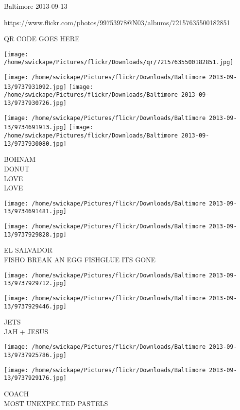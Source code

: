 \documentclass[10pt,letterpaper]{article}
\begin{document}
Baltimore 2013-09-13

https://www.flickr.com/photos/99753978@N03/albums/72157635500182851

QR CODE GOES HERE

\texttt{[image: /home/swickape/Pictures/flickr/Downloads/qr/72157635500182851.jpg]}
\pagebreak

\texttt{[image: /home/swickape/Pictures/flickr/Downloads/Baltimore 2013-09-13/9737931092.jpg]}
\texttt{[image: /home/swickape/Pictures/flickr/Downloads/Baltimore 2013-09-13/9737930726.jpg]}

\texttt{[image: /home/swickape/Pictures/flickr/Downloads/Baltimore 2013-09-13/9734691913.jpg]}
\texttt{[image: /home/swickape/Pictures/flickr/Downloads/Baltimore 2013-09-13/9737930080.jpg]}

BOHNAM\\
DONUT\\
LOVE\\
LOVE\\
\pagebreak

\texttt{[image: /home/swickape/Pictures/flickr/Downloads/Baltimore 2013-09-13/9734691481.jpg]}

\vspace{0.25in}
\texttt{[image: /home/swickape/Pictures/flickr/Downloads/Baltimore 2013-09-13/9737929828.jpg]}

EL SALVADOR\\
FISHO BREAK AN EGG FISHGLUE ITS GONE\\
\pagebreak

\texttt{[image: /home/swickape/Pictures/flickr/Downloads/Baltimore 2013-09-13/9737929712.jpg]}

\vspace{0.25in}
\texttt{[image: /home/swickape/Pictures/flickr/Downloads/Baltimore 2013-09-13/9737929446.jpg]}

JETS\\
JAH + JESUS\\
\pagebreak

\texttt{[image: /home/swickape/Pictures/flickr/Downloads/Baltimore 2013-09-13/9737925786.jpg]}

\vspace{0.25in}
\texttt{[image: /home/swickape/Pictures/flickr/Downloads/Baltimore 2013-09-13/9737929176.jpg]}

COACH\\
MOST UNEXPECTED PASTELS\\
\pagebreak
\end{document}
